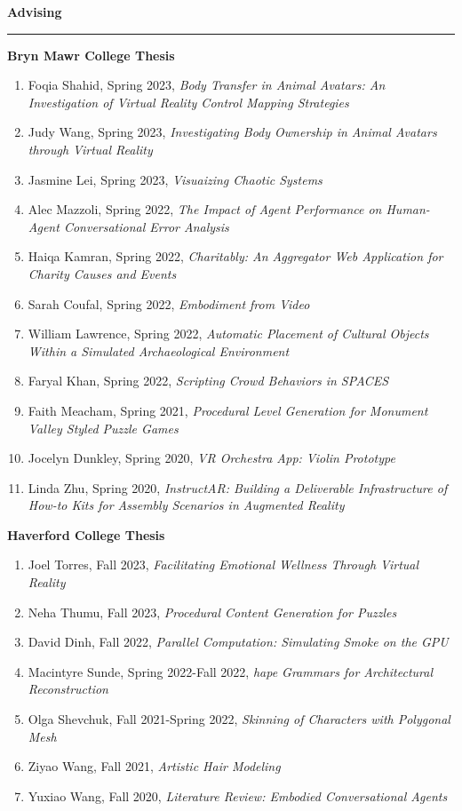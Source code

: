 \needspace{6em}
{\large {\bf Advising}}
\vspace{0.1cm}
\hrule
\medskip
\medskip

{\bf Bryn Mawr College Thesis }
\vspace{-1.0em}

\begin{enumerate}[leftmargin=*,label={}]
  \item Foqia Shahid, Spring 2023, \textit{Body Transfer in Animal Avatars: An Investigation of Virtual Reality Control Mapping Strategies}
  \item Judy Wang, Spring 2023, \textit{Investigating Body Ownership in Animal Avatars through Virtual Reality}
  \item Jasmine Lei, Spring 2023, \textit{Visuaizing Chaotic Systems}
  \item Alec Mazzoli, Spring 2022, \textit{The Impact of Agent Performance on Human-Agent Conversational Error Analysis}
  \item Haiqa Kamran, Spring 2022, \textit{Charitably: An Aggregator Web Application for Charity Causes and Events}
  \item Sarah Coufal, Spring 2022, \textit{Embodiment from Video}
  \item William Lawrence, Spring 2022, \textit{Automatic Placement of Cultural Objects Within a Simulated Archaeological Environment}
  \item Faryal Khan, Spring 2022, \textit{Scripting Crowd Behaviors in SPACES}
  \item Faith Meacham, Spring 2021, \textit{Procedural Level Generation for \textit{Monument Valley} Styled Puzzle Games}
  \item Jocelyn Dunkley, Spring 2020, \textit{VR Orchestra App: Violin Prototype}
  \item Linda Zhu, Spring 2020, \textit{InstructAR: Building a Deliverable Infrastructure of How-to Kits for Assembly Scenarios in Augmented Reality}
\end{enumerate}

{\bf Haverford College Thesis}
\vspace{-1.0em}

\begin{enumerate}[leftmargin=*,label={}]
  \item Joel Torres, Fall 2023, \textit{Facilitating Emotional Wellness Through Virtual Reality}
  \item Neha Thumu, Fall 2023, \textit{Procedural Content Generation for Puzzles}
  \item David Dinh, Fall 2022, \textit{Parallel Computation: Simulating Smoke on the GPU}
  \item Macintyre Sunde, Spring 2022-Fall 2022, \textit{hape Grammars for Architectural Reconstruction}
  \item Olga Shevchuk, Fall 2021-Spring 2022, \textit{Skinning of Characters with Polygonal Mesh}
  \item Ziyao Wang, Fall 2021, \textit{Artistic Hair Modeling}
  \item Yuxiao Wang, Fall 2020, \textit{Literature Review: Embodied Conversational Agents}
\end{enumerate}

